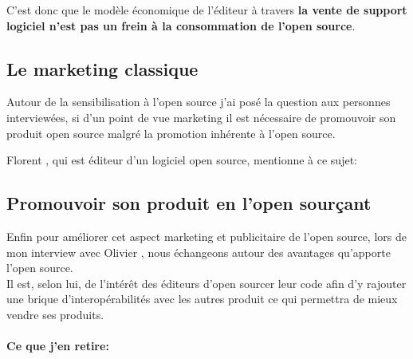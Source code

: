 			C'est donc que le modèle économique de l'éditeur à travers \textbf{la vente de support logiciel n'est pas un frein à la consommation de l'open source}.

		\subsection{Le marketing classique}

			Autour de la sensibilisation à l'open source j'ai posé la question aux personnes interviewées, si d'un point de vue marketing il est nécessaire de promouvoir son produit open source malgré la promotion inhérente à l'open source.

			Florent , qui est éditeur d'un logiciel open source, mentionne à ce sujet:

			\begin{center}
					\textit{
					}
			\end{center}

		\subsection{Promouvoir son produit en l'open sourçant}

			Enfin pour améliorer cet aspect marketing et publicitaire de l'open source, lors de mon interview avec Olivier , nous échangeons autour des avantages qu'apporte l'open source.\\

			Il est, selon lui, de l'intérêt des éditeurs d'open sourcer leur code afin d'y rajouter une brique d'interopérabilités avec les autres produit ce qui permettra de mieux vendre ses produits.

			\begin{center}
				\textit{
					}
			\end{center}


			\paragraph{Ce que j'en retire:\\}

